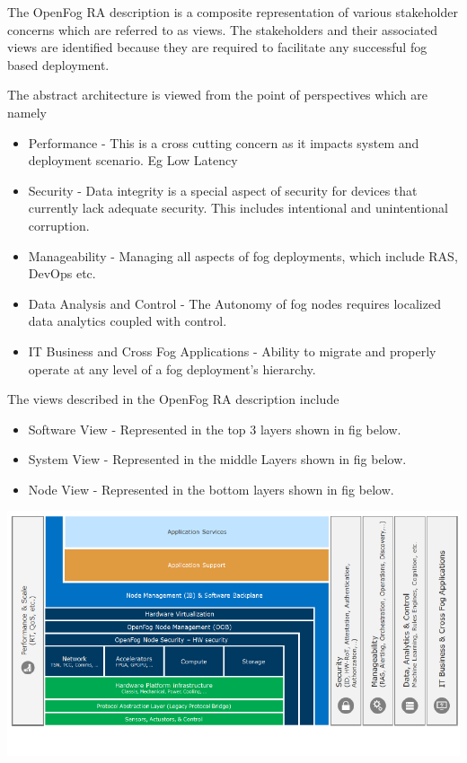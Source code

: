 \documentclass{article}
\begin{document}
The OpenFog RA description is a composite representation of various stakeholder concerns which are referred to as views. The stakeholders and their associated views are identified because they are required to facilitate any successful fog based deployment\cite{openfogconsortium2017}. 

The abstract architecture is viewed from the point of perspectives\cite{openfogconsortium2017} which are namely 
\begin{itemize}
\item Performance - This is a cross cutting concern as it impacts system and deployment scenario. Eg Low Latency
\item Security - Data integrity is a special aspect of security for devices that currently lack adequate security. This includes intentional and unintentional corruption.
\item Manageability - Managing all aspects of fog deployments, which include RAS, DevOps etc. 
\item Data Analysis and Control -  The Autonomy of fog nodes requires localized data analytics coupled with control.
\item IT Business and Cross Fog Applications -  Ability to migrate and properly operate at any level of a fog deployment’s hierarchy.  
\end{itemize}

The views\cite{openfogconsortium2017} described in the OpenFog RA description include 
\begin{itemize}
\item Software View - Represented in the top 3 layers shown in fig below.
\item System View - Represented in the middle Layers shown in fig below.
\item Node View - Represented in the bottom layers shown in fig below.
\end{itemize} 

\includegraphics[scale=0.7]{figa.png}
\end{document}
